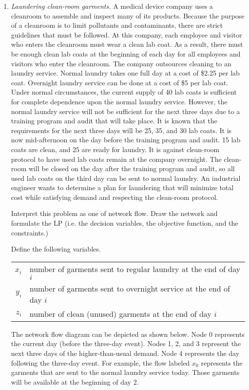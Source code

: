 \begin{enumerate}
\item \emph{Laundering clean-room garments.} A medical device company
  uses a cleanroom to assemble and inspect many of its
  products. Because the purpose of a cleanroom is to limit pollutants
  and contaminants, there are strict guidelines that must be
  followed. At this company, each employee and visitor who enters the
  cleanroom must wear a clean lab coat. As a result, there must be
  enough clean lab coats at the beginning of each day for all
  employees and visitors who enter the cleanroom. The company
  outsources cleaning to an laundry service. Normal laundry takes one
  full day at a cost of \$2.25 per lab coat. Overnight laundry service
  can be done at a cost of \$5 per lab coat. Under normal
  circumstances, the current supply of 40 lab coats is sufficient for
  complete dependence upon the normal laundry service. However, the
  normal laundry service will not be sufficient for the next three
  days due to a training program and audit that will take place. It is
  known that the requirements for the next three days will be 25, 35,
  and 30 lab coats. It is now mid-afternoon on the day before the
  training program and audit. 15 lab coats are clean, and 25 are ready
  for laundry. It is against clean-room protocol to have used lab
  coats remain at the company overnight. The clean-room will be closed
  on the day after the training program and audit, so all used lab
  coats on the third day can be sent to normal laundry. An industrial
  engineer wants to determine a plan for laundering that will minimize
  total cost while satisfying demand and respecting the clean-room
  protocol.

  Interpret this problem as one of network flow.  Draw the network and
  formulate the LP (i.e. the decision variables, the objective
  function, and the constraints.)

\begin{solution}
\bs Define the following variables.

\begin{tabular}{rl}
$x_i$ & number of garments sent to regular laundry at the end of day $i$ \\
$y_i$ & number of garments sent to overnight service at the end of day $i$ \\
$z_i$ & number of clean (unused) garments at the end of day $i$
\end{tabular}

The network flow diagram can be depicted as shown below. Node 0 represents the
current day (before the three-day event). Nodes 1, 2, and 3 represent the next
three days of the higher-than-usual demand. Node 4 represents the day following
the three-day event. For example, the flow labeled $x_0$ represents the garments
that are sent to the normal laundry service today. Those garments will be
available at the beginning of day 2.


\end{solution}
\end{enumerate}
